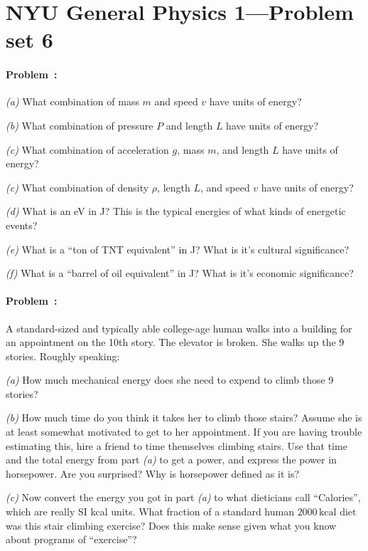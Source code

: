 \documentclass[12pt]{article}
\newcommand{\kcal}{\mathrm{kcal}}
\begin{document}
\thispagestyle{empty}

\section*{NYU General Physics 1---Problem set 6}

\paragraph{Problem~\theproblem:}%
\textsl{(a)} What combination of mass $m$ and speed $v$ have units of energy?

\textsl{(b)} What combination of pressure $P$ and length $L$ have units of energy?

\textsl{(c)} What combination of acceleration $g$, mass $m$, and length $L$ have units of energy?

\textsl{(c)} What combination of density $\rho$, length $L$, and speed $v$ have units of energy?

\textsl{(d)} What is an eV in J?  This is the typical energies of what kinds of energetic events?

\textsl{(e)} What is a ``ton of TNT equivalent'' in J?  What is it's cultural significance?

\textsl{(f)} What is a ``barrel of oil equivalent'' in J?  What is it's economic significance?

\paragraph{Problem~\theproblem:}%
A standard-sized and typically able college-age human  walks into a building for an appointment on the 10th story.  The
elevator is broken.  She walks up the 9 stories.  Roughly speaking:

\textsl{(a)} How much mechanical energy does she need to expend to climb
those 9 stories?

\textsl{(b)} How much time do you think it takes her to climb those
stairs?  Assume she is at least somewhat motivated to get to her
appointment.  If you are having trouble estimating this, hire a friend
to time themselves climbing stairs.  Use that time and the total
energy from part \textsl{(a)} to get a power, and express the power in
horsepower.  Are you surprised?  Why is horsepower defined as it is?

\textsl{(c)} Now convert the energy you got in part \textsl{(a)} to
what dieticians call ``Calories'', which are really SI kcal units.
What fraction of a standard human $2000\,\kcal$ diet was this stair
climbing exercise?  Does this make sense given what you know about
programs of ``exercise''?
\end{document}
